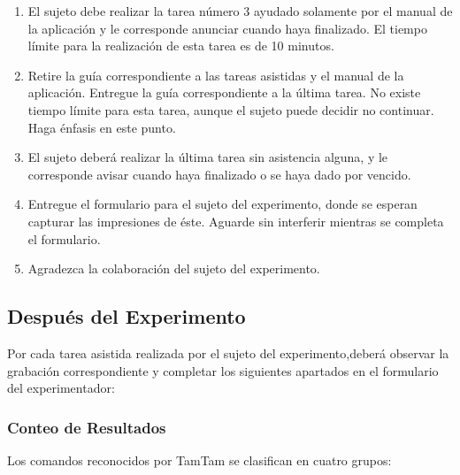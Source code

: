 \begin{enumerate}
    \item El sujeto debe realizar la tarea n\'umero 3 ayudado solamente por el manual de la aplicaci\'on y le corresponde anunciar cuando haya finalizado. El tiempo l\'imite para la realizaci\'on de esta tarea es de 10 minutos.
    \item Retire la gu\'ia correspondiente a las tareas asistidas y el manual de la aplicaci\'on. Entregue la gu\'ia correspondiente a la \'ultima tarea. No existe tiempo l\'imite para esta tarea, aunque el sujeto puede decidir no continuar. Haga \'enfasis en este punto.
    \item El sujeto deber\'a realizar la \'ultima tarea  sin asistencia alguna, y le corresponde avisar cuando haya finalizado o se haya dado por vencido.
    \item Entregue el formulario para el sujeto del experimento, donde se esperan capturar las impresiones de \'este. Aguarde sin interferir mientras se completa el formulario.
    \item Agradezca la colaboraci\'on del sujeto del experimento.
\end{enumerate}


\subsection{Despu\'es del Experimento}

 Por cada tarea asistida realizada por el sujeto del experimento,deber\'a observar la grabaci\'on correspondiente y completar los siguientes apartados en el formulario del experimentador:

\subsubsection{Conteo de Resultados}

 Los comandos reconocidos por TamTam se clasifican en cuatro grupos:

